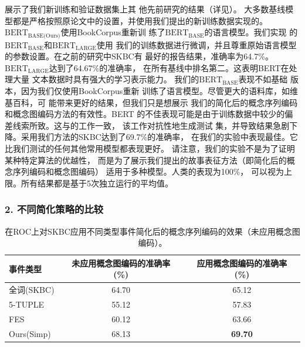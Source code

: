 展示了我们新训练和验证数据集上其
他先前研究的结果（详见）。
大多数基线模型都是严格按照原论文中的设置，并使用我们提出的新训练数据实现的。
$\text{BERT}_{\text{BASE(Ours)}}$使用BookCorpus重新训
练了$\text{BERT}_{\text{BASE}}$的语言模型。我们实现
的$\text{BERT}_{\text{BASE}}$和$\text{BERT}_{\text{LARGE}}$使用
我们的训练数据进行微调，并且尊重原始语言模型的参数设置。在之前的研究中SKBC有
最好的报告结果，准确率为64.7\%。
$\text{BERT}_{\text{LARGE}}$达到了64.67\%的准确率，
在所有基线中排名第二。这表明BERT在处理大量
文本数据时具有强大的学习表示能力。
我们的$\text{BERT}_{\text{BASE}}$表现不如基础
版本，因为我们仅使用BookCorpus重新
训练了语言模型。尽管更大的语料库，如维基百科，可
能带来更好的结果，但我们只是想展示
我们的简化后的概念序列编码和概念图编码方法的有效性。BERT
的不佳表现可能是由于训练数据中较少的偏
差线索所致。这与\cite{niven2019probing}的工作一致，
该工作对抗性地生成测试
集，并导致结果急剧下降。采用我们方法的SKBC达到了69.7\%的准确率，
在我们的实验中表现最佳。它比我们测试的任何其他常用模型都表现更好。
请注意，我们的实验不是为了证明某种特定算法的优越性，
而是为了展示我们提出的故事表征方法（即简化后的概念序列编码和概念图编码）
适用于多种模型。人类的表现为100\%，
可以视为上限\cite{mostafazadeh2016corpus}。所有结果都是基于5次独立运行的平均值。

\subsubsection*{2. 不同简化策略的比较}
\label{sec2:simplify}

\begin{table}
\small
\centering
\begin{tabular}{lcc}
\toprule
\textbf{事件类型} & 未应用概念图编码的准确率 (\%) & 应用概念图编码的准确率 (\%)\\
\midrule
全词(SKBC)& 64.70 & 65.12\\
\midrule
5-TUPLE&55.12 &57.83\\
FES&60.12 &63.66\\
Ours(Simp)& 68.13 &{\bf 69.70} \\
\bottomrule
\end{tabular}
\caption{在ROC上对SKBC应用不同类型事件简化后的概念序列编码的效果（未应用概念图编码）。}
\label{tab2:sse}
\end{table}

\begin{table}
\small
\centering
{}
\caption{采用不同事件类型进行简化对词序列长度的影响。简化前 = 简化前平均词数，简化后 = 简化后平均词数，事件 = 提取的平均事件数。}
\label{tab2:size}
\end{table}

